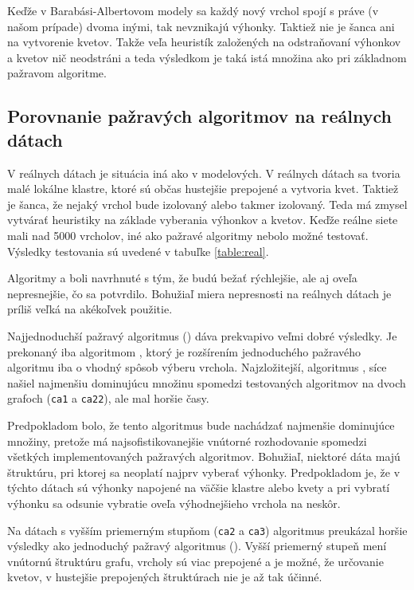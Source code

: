 Keďže v Barabási-Albertovom modely sa každý nový vrchol spojí s práve (v našom 
prípade) dvoma inými, tak nevznikajú výhonky. Taktiež nie je šanca ani na 
vytvorenie kvetov. Takže veľa heuristík založených na odstraňovaní výhonkov a 
kvetov nič neodstráni a teda výsledkom je taká istá množina ako pri základnom 
pažravom algoritme.

\subsection{Porovnanie pažravých algoritmov na reálnych dátach}

V reálnych dátach je situácia iná ako v modelových. V reálnych dátach sa tvoria 
malé lokálne klastre, ktoré sú občas hustejšie prepojené a vytvoria kvet. 
Taktiež je šanca, že nejaký vrchol bude izolovaný alebo takmer izolovaný. Teda 
má zmysel vytvárať heuristiky na základe vyberania výhonkov a kvetov. Keďže 
reálne siete mali nad 5000 vrcholov, iné ako pažravé algoritmy nebolo možné 
testovať. Výsledky testovania sú uvedené v tabuľke \ref{table:real}. 

Algoritmy  a  boli navrhnuté s tým, že budú bežať 
rýchlejšie, ale aj oveľa nepresnejšie, čo sa potvrdilo. Bohužiaľ miera 
nepresnosti na reálnych dátach je príliš veľká na akékoľvek použitie.

Najjednoduchší pažravý algoritmus () dáva 
prekvapivo veľmi dobré výsledky. Je prekonaný iba algoritmom , 
ktorý je rozšírením jednoduchého pažravého algoritmu iba o vhodný spôsob 
výberu vrchola. Najzložitejší, algoritmus , síce našiel najmenšiu 
dominujúcu množinu spomedzi testovaných algoritmov na dvoch grafoch 
(\texttt{ca1} a \texttt{ca22}), ale mal horšie časy. 

Predpokladom bolo, že 
tento algoritmus bude nachádzať najmenšie dominujúce množiny, pretože má 
najsofistikovanejšie vnútorné rozhodovanie spomedzi všetkých implementovaných 
pažravých algoritmov. Bohužiaľ, niektoré dáta majú štruktúru, pri ktorej sa 
neoplatí najprv vyberať výhonky. Predpokladom je, že v týchto dátach sú 
výhonky napojené na väčšie klastre alebo kvety a pri vybratí výhonku sa odsunie 
vybratie oveľa výhodnejšieho vrchola na neskôr.

Na dátach s vyšším priemerným stupňom (\texttt{ca2} a \texttt{ca3}) 
algoritmus  preukázal horšie výsledky ako jednoduchý pažravý 
algoritmus (). Vyšší priemerný stupeň mení vnútornú štruktúru 
grafu, vrcholy sú viac prepojené a je možné, že určovanie kvetov, v hustejšie 
prepojených štruktúrach nie je až tak účinné.

